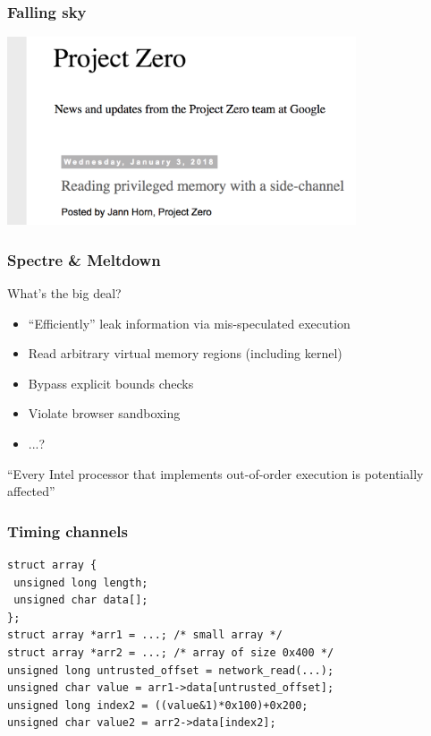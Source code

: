 \documentclass[10pt]{beamer}
\begin{document}

\begin{frame}

\frametitle{Falling sky}

\centering
\includegraphics[height=15em]{sidechan-blog.png}

\end{frame}


\begin{frame}

\frametitle{Spectre \& Meltdown}

What's the big deal? \pause
\begin{itemize}
\item ``Efficiently'' leak information via mis-speculated execution
\item Read arbitrary virtual memory regions (including kernel)
\item Bypass explicit bounds checks
\item Violate browser sandboxing
\item ...? \\[1em]
\end{itemize}

\pause
\begin{center}
``Every Intel processor that implements out-of-order execution is potentially affected''
\end{center}

\end{frame}


\begin{frame}[fragile]

\frametitle{Timing channels}

\begin{lstlisting}[basicstyle=\small,style=customjava]
struct array {
 unsigned long length;
 unsigned char data[];
};
struct array *arr1 = ...; /* small array */
struct array *arr2 = ...; /* array of size 0x400 */
unsigned long untrusted_offset = network_read(...);
unsigned char value = arr1->data[untrusted_offset];
unsigned long index2 = ((value&1)*0x100)+0x200;
unsigned char value2 = arr2->data[index2];
\end{lstlisting}

\end{frame}
\end{document}

